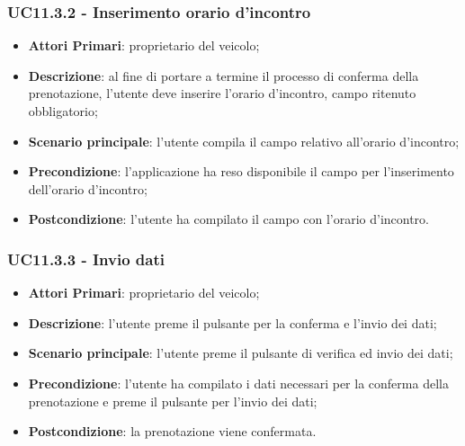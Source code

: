 \subsubsection{UC11.3.2 - Inserimento orario d'incontro}
\begin{itemize}
	\item \textbf{Attori Primari}: proprietario del veicolo;
	\item \textbf{Descrizione}: al fine di portare a termine il processo di conferma della prenotazione, l'utente deve inserire l'orario d'incontro, campo ritenuto obbligatorio;
	\item \textbf{Scenario principale}: l'utente compila il campo relativo all'orario d'incontro;	
	\item \textbf{Precondizione}: l'applicazione ha reso disponibile il campo per l'inserimento dell'orario d'incontro;
	\item \textbf{Postcondizione}: l'utente ha compilato il campo con l'orario d'incontro.	
\end{itemize}

\subsubsection{UC11.3.3 - Invio dati}
\begin{itemize}
	\item \textbf{Attori Primari}: proprietario del veicolo;
	\item \textbf{Descrizione}: l'utente preme il pulsante per la conferma e l'invio dei dati;
	\item \textbf{Scenario principale}: l'utente preme il pulsante di verifica ed invio dei dati;	
	\item \textbf{Precondizione}: l'utente ha compilato i dati necessari per la conferma della prenotazione e preme il pulsante per l'invio dei dati;
	\item \textbf{Postcondizione}: la prenotazione viene confermata.
\end{itemize}

